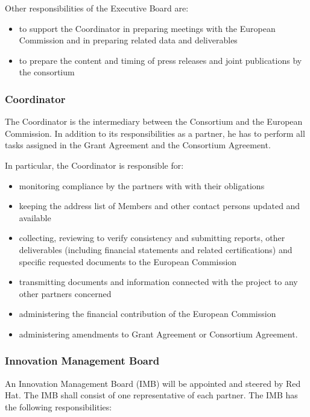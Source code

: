 \documentclass[a4paper,11pt]{article}
\begin{document}
Other responsibilities of the Executive Board are:
\begin{itemize}
\item to support the Coordinator in preparing meetings with the European Commission and in preparing related data and deliverables
\item to prepare the content and timing of press releases and joint publications by the consortium
\end{itemize}

\subsubsection{Coordinator}

The Coordinator is the intermediary between the Consortium and the European Commission. In addition to its responsibilities as a partner, he has to perform all tasks assigned in the Grant Agreement and the Consortium Agreement.

In particular, the Coordinator is responsible for:
\begin{itemize}
\item monitoring compliance by the partners with with their obligations
\item keeping the address list of Members and other contact persons updated and available 
\item collecting, reviewing to verify consistency and submitting reports, other deliverables (including financial statements and related certifications) and specific requested documents to the European Commission
\item transmitting documents and information connected with the project to any other partners concerned
\item administering the financial contribution of the European Commission
\item administering amendments to Grant Agreement or Consortium Agreement.
\end{itemize}

\subsubsection{Innovation Management Board}

An Innovation Management Board (IMB) will be appointed and steered by Red Hat. The IMB shall consist of one representative of each partner.
The IMB has the following responsibilities:
\end{document}
